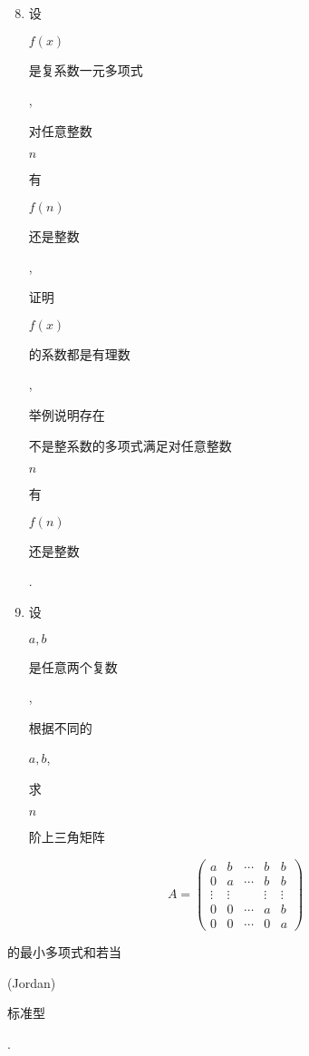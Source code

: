 \documentclass[10pt]{article}
\begin{document}
\begin{enumerate}
  \setcounter{enumi}{7}
  \item \begin{CJK}{UTF8}{mj}设\end{CJK} $f(x)$ \begin{CJK}{UTF8}{mj}是复系数一元多项式\end{CJK}, \begin{CJK}{UTF8}{mj}对任意整数\end{CJK} $n$ \begin{CJK}{UTF8}{mj}有\end{CJK} $f(n)$ \begin{CJK}{UTF8}{mj}还是整数\end{CJK}, \begin{CJK}{UTF8}{mj}证明\end{CJK} $f(x)$ \begin{CJK}{UTF8}{mj}的系数都是有理数\end{CJK}, \begin{CJK}{UTF8}{mj}举例说明存在\end{CJK} \begin{CJK}{UTF8}{mj}不是整系数的多项式满足对任意整数\end{CJK} $n$ \begin{CJK}{UTF8}{mj}有\end{CJK} $f(n)$ \begin{CJK}{UTF8}{mj}还是整数\end{CJK}.

  \item \begin{CJK}{UTF8}{mj}设\end{CJK} $a, b$ \begin{CJK}{UTF8}{mj}是任意两个复数\end{CJK}, \begin{CJK}{UTF8}{mj}根据不同的\end{CJK} $a, b$, \begin{CJK}{UTF8}{mj}求\end{CJK} $n$ \begin{CJK}{UTF8}{mj}阶上三角矩阵\end{CJK}

\end{enumerate}
$$
A=\left(\begin{array}{ccccc}
a & b & \cdots & b & b \\
0 & a & \cdots & b & b \\
\vdots & \vdots & & \vdots & \vdots \\
0 & 0 & \cdots & a & b \\
0 & 0 & \cdots & 0 & a
\end{array}\right)
$$
\begin{CJK}{UTF8}{mj}的最小多项式和若当\end{CJK} (Jordan) \begin{CJK}{UTF8}{mj}标准型\end{CJK}.
\end{document}
